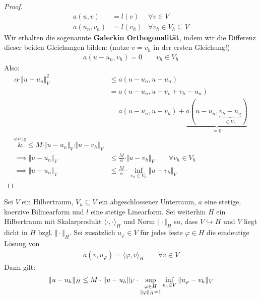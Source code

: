 \begin{proof}
	\begin{align*}
		a(u,v)&=l(v) &\forall v\in V\\
		a(u_n,v_h)&= l(v_h) &\forall v_h\in V_h\subseteq V
	\end{align*}
	Wir erhalten die sogenannte \textbf{Galerkin Orthogonalität}, indem wir die Differenz dieser beiden Gleichungen bilden: 
	(nutze $v=v_h$ in der ersten Gleichung!) 
	\begin{align}\label{eqGalerkinOrthogonalitaet}\tag{GalerkinOrtho}
		a(u-u_n,v_h)=0\qquad v_h\in V_h
	\end{align}
	Also:
	\begin{align*}
		\alpha\cdot\Vert u-u_n\Vert^2_V
		&\leq
		a(u-u_n,u-u_n)\\
		&=a(u-u_n,u-v_v+v_h- u_n)\\
		&=a(u-u_n,u-v_h)+\underbrace{a(u-u_n,\underbrace{v_h-u_n}_{\in V_h})}_{=0}\\
		\overset{\text{stetig}}&{\leq}
		M\cdot\Vert u-u_n\Vert_V\cdot\Vert u-v_h\Vert_V\\
		\implies
		\Vert u-u_n\Vert_V&\leq\frac{M}{\alpha}\cdot\Vert u-v_h\Vert_V\qquad\forall v_h\in V_h\\
		\implies
		\Vert u-u_n\Vert_V&\leq \frac{M}{\alpha}\cdot\inf\limits_{v_h\in V_h}\Vert u-v_h\Vert_V
	\end{align*}
\end{proof}

\begin{theorem}\enter\label{theorem2.3AubinNietscheDualitaetsargument}
	Sei $V$ ein Hilbertraum, $V_h\subseteq V$ ein abgeschlossener Unterraum, $a$ eine stetige, koerzive Bilinearform und $l$ eine stetige Linearform. 
	Sei weiterhin $H$ ein Hilbertraum mit Skalarprodukt $\langle\cdot,\cdot\rangle_H$ und Norm $\Vert\cdot\Vert_H$ so, dass $V\hookrightarrow H$ und $V$ liegt dicht in $H$ bzgl. $\Vert\cdot\Vert_H$. 
	Sei zusätzlich $u_\varphi\in V$ für jedes feste $\varphi\in H$ die eindeutige Lösung von
	\begin{align}\label{Dtheorem2.3}\tag{D}
		a(v,u_\varphi)=\langle\varphi,v\rangle_H\qquad\forall v\in V
	\end{align}
	Dann gilt:
	\begin{align*}
		\Vert u-u_h\Vert_H\leq M\cdot\Vert u-u_h\Vert_V\cdot\sup\limits_{\begin{subarray}{c}
			\varphi\in H\\
			\Vert\varphi\Vert_H=1
		\end{subarray}}\inf\limits_{v_h\in V}\Vert u_\varphi-v_h\Vert_V
	\end{align*}
\end{theorem}

